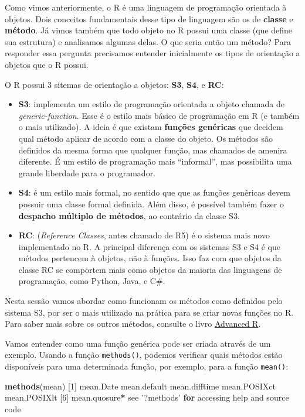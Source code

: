 \documentclass[10pt,a4paper]{book}
\newenvironment{Shaded}{\begin{snugshade}}{\end{snugshade}}
\newcommand{\KeywordTok}[1]{\textcolor[rgb]{0.13,0.29,0.53}{\textbf{#1}}}
\newcommand{\DecValTok}[1]{\textcolor[rgb]{0.00,0.00,0.81}{#1}}
\newcommand{\StringTok}[1]{\textcolor[rgb]{0.31,0.60,0.02}{#1}}
\newcommand{\ControlFlowTok}[1]{\textcolor[rgb]{0.13,0.29,0.53}{\textbf{#1}}}
\newcommand{\OperatorTok}[1]{\textcolor[rgb]{0.81,0.36,0.00}{\textbf{#1}}}
\newcommand{\NormalTok}[1]{#1}
\providecommand{\tightlist}{%
  \setlength{\itemsep}{0pt}\setlength{\parskip}{0pt}}
\begin{document}
Como vimos anteriormente, o R é uma linguagem de programação orientada à
objetos. Dois conceitos fundamentais desse tipo de linguagem são os de
\textbf{classe} e \textbf{método}. Já vimos também que todo objeto no R
possui uma classe (que define sua estrutura) e analisamos algumas delas.
O que seria então um método? Para responder essa pergunta precisamos
entender inicialmente os tipos de orientação a objetos que o R possui.

O R possui 3 sitemas de orientação a objetos: \textbf{S3}, \textbf{S4},
e \textbf{RC}:

\begin{itemize}
\tightlist
\item
  \textbf{S3}: implementa um estilo de programação orientada a objeto
  chamada de \emph{generic-function}. Esse é o estilo mais básico de
  programação em R (e também o mais utilizado). A ideia é que existam
  \textbf{funções genéricas} que decidem qual método aplicar de acordo
  com a classe do objeto. Os métodos são definidos da mesma forma que
  qualquer função, mas chamados de amenira diferente. É um estilo de
  programação mais ``informal'', mas possibilita uma grande liberdade
  para o programador.
\item
  \textbf{S4}: é um estilo mais formal, no sentido que que as funções
  genéricas devem possuir uma classe formal definida. Além disso, é
  possível também fazer o \textbf{despacho múltiplo de métodos}, ao
  contrário da classe S3.
\item
  \textbf{RC}: (\emph{Reference Classes}, antes chamado de R5) é o
  sistema mais novo implementado no R. A principal diferença com os
  sistemas S3 e S4 é que métodos pertencem à objetos, não à funções.
  Isso faz com que objetos da classe RC se comportem mais como objetos
  da maioria das linguagens de programação, como Python, Java, e C\#.
\end{itemize}

Nesta sessão vamos abordar como funcionam os métodos como definidos pelo
sistema S3, por ser o mais utilizado na prática para se criar novas
funções no R. Para saber mais sobre os outros métodos, consulte o livro
\href{http://adv-r.had.co.nz/OO-essentials.html}{Advanced R}.

Vamos entender como uma função genérica pode ser criada através de um
exemplo. Usando a função \texttt{methods()}, podemos verificar quais
métodos estão disponíveis para uma determinada função, por exemplo, para
a função \texttt{mean()}:

\begin{Shaded}
\begin{Highlighting}[]
\KeywordTok{methods}\NormalTok{(mean)}
\NormalTok{[}\DecValTok{1}\NormalTok{] mean.Date     mean.default  mean.difftime mean.POSIXct  mean.POSIXlt }
\NormalTok{[}\DecValTok{6}\NormalTok{] mean.quosure}\OperatorTok{*}
\NormalTok{see }\StringTok{'?methods'} \ControlFlowTok{for}\NormalTok{ accessing help and source code}
\end{Highlighting}
\end{Shaded}
\end{document}
